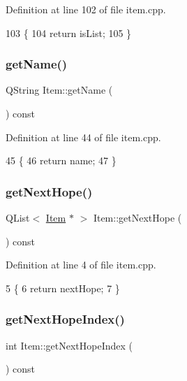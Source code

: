 Definition at line 102 of file item.\+cpp.


\begin{DoxyCode}
103 \{
104     \textcolor{keywordflow}{return} isList;
105 \}
\end{DoxyCode}
\mbox{\label{class_item_a926b576dfdb3a48d93d8eb6aeba6d64a}} 
\subsubsection{\texorpdfstring{get\+Name()}{getName()}}
{\footnotesize\ttfamily Q\+String Item\+::get\+Name (\begin{DoxyParamCaption}{ }\end{DoxyParamCaption}) const}



Definition at line 44 of file item.\+cpp.


\begin{DoxyCode}
45 \{
46     \textcolor{keywordflow}{return} name;
47 \}
\end{DoxyCode}
\mbox{\label{class_item_a561400c0ac0bc9734b08878eaf5625ed}} 
\subsubsection{\texorpdfstring{get\+Next\+Hope()}{getNextHope()}}
{\footnotesize\ttfamily Q\+List$<$ \hyperlink{class_item}{Item} $\ast$ $>$ Item\+::get\+Next\+Hope (\begin{DoxyParamCaption}{ }\end{DoxyParamCaption}) const}



Definition at line 4 of file item.\+cpp.


\begin{DoxyCode}
5 \{
6     \textcolor{keywordflow}{return} nextHope;
7 \}
\end{DoxyCode}
\mbox{\label{class_item_a6ccb1728ae39e87cfd1430f252916983}} 
\subsubsection{\texorpdfstring{get\+Next\+Hope\+Index()}{getNextHopeIndex()}}
{\footnotesize\ttfamily int Item\+::get\+Next\+Hope\+Index (\begin{DoxyParamCaption}{ }\end{DoxyParamCaption}) const}



